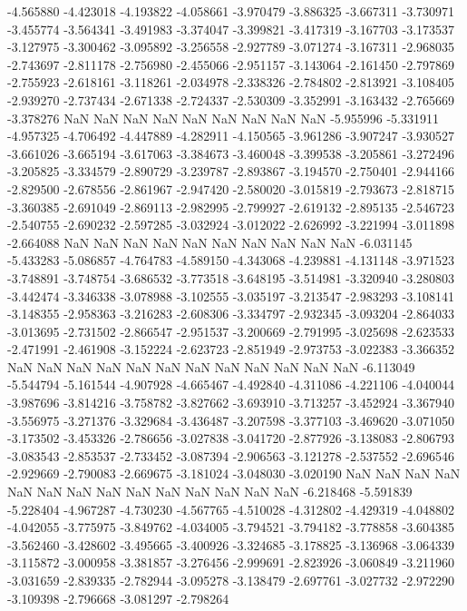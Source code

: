 -4.565880
-4.423018
-4.193822
-4.058661
-3.970479
-3.886325
-3.667311
-3.730971
-3.455774
-3.564341
-3.491983
-3.374047
-3.399821
-3.417319
-3.167703
-3.173537
-3.127975
-3.300462
-3.095892
-3.256558
-2.927789
-3.071274
-3.167311
-2.968035
-2.743697
-2.811178
-2.756980
-2.455066
-2.951157
-3.143064
-2.161450
-2.797869
-2.755923
-2.618161
-3.118261
-2.034978
-2.338326
-2.784802
-2.813921
-3.108405
-2.939270
-2.737434
-2.671338
-2.724337
-2.530309
-3.352991
-3.163432
-2.765669
-3.378276
NaN
NaN
NaN
NaN
NaN
NaN
NaN
NaN
NaN
-5.955996
-5.331911
-4.957325
-4.706492
-4.447889
-4.282911
-4.150565
-3.961286
-3.907247
-3.930527
-3.661026
-3.665194
-3.617063
-3.384673
-3.460048
-3.399538
-3.205861
-3.272496
-3.205825
-3.334579
-2.890729
-3.239787
-2.893867
-3.194570
-2.750401
-2.944166
-2.829500
-2.678556
-2.861967
-2.947420
-2.580020
-3.015819
-2.793673
-2.818715
-3.360385
-2.691049
-2.869113
-2.982995
-2.799927
-2.619132
-2.895135
-2.546723
-2.540755
-2.690232
-2.597285
-3.032924
-3.012022
-2.626992
-3.221994
-3.011898
-2.664088
NaN
NaN
NaN
NaN
NaN
NaN
NaN
NaN
NaN
NaN
-6.031145
-5.433283
-5.086857
-4.764783
-4.589150
-4.343068
-4.239881
-4.131148
-3.971523
-3.748891
-3.748754
-3.686532
-3.773518
-3.648195
-3.514981
-3.320940
-3.280803
-3.442474
-3.346338
-3.078988
-3.102555
-3.035197
-3.213547
-2.983293
-3.108141
-3.148355
-2.958363
-3.216283
-2.608306
-3.334797
-2.932345
-3.093204
-2.864033
-3.013695
-2.731502
-2.866547
-2.951537
-3.200669
-2.791995
-3.025698
-2.623533
-2.471991
-2.461908
-3.152224
-2.623723
-2.851949
-2.973753
-3.022383
-3.366352
NaN
NaN
NaN
NaN
NaN
NaN
NaN
NaN
NaN
NaN
NaN
NaN
-6.113049
-5.544794
-5.161544
-4.907928
-4.665467
-4.492840
-4.311086
-4.221106
-4.040044
-3.987696
-3.814216
-3.758782
-3.827662
-3.693910
-3.713257
-3.452924
-3.367940
-3.556975
-3.271376
-3.329684
-3.436487
-3.207598
-3.377103
-3.469620
-3.071050
-3.173502
-3.453326
-2.786656
-3.027838
-3.041720
-2.877926
-3.138083
-2.806793
-3.083543
-2.853537
-2.733452
-3.087394
-2.906563
-3.121278
-2.537552
-2.696546
-2.929669
-2.790083
-2.669675
-3.181024
-3.048030
-3.020190
NaN
NaN
NaN
NaN
NaN
NaN
NaN
NaN
NaN
NaN
NaN
NaN
NaN
NaN
-6.218468
-5.591839
-5.228404
-4.967287
-4.730230
-4.567765
-4.510028
-4.312802
-4.429319
-4.048802
-4.042055
-3.775975
-3.849762
-4.034005
-3.794521
-3.794182
-3.778858
-3.604385
-3.562460
-3.428602
-3.495665
-3.400926
-3.324685
-3.178825
-3.136968
-3.064339
-3.115872
-3.000958
-3.381857
-3.276456
-2.999691
-2.823926
-3.060849
-3.211960
-3.031659
-2.839335
-2.782944
-3.095278
-3.138479
-2.697761
-3.027732
-2.972290
-3.109398
-2.796668
-3.081297
-2.798264
